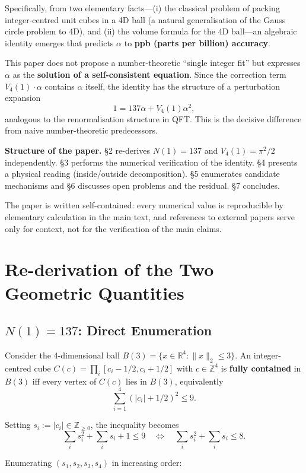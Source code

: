 \documentclass[a4paper,11pt]{article}
\begin{document}
Specifically, from two elementary facts---(i) the classical problem of packing integer-centred unit cubes in a 4D ball (a natural generalisation of the Gauss circle problem to 4D), and (ii) the volume formula for the 4D ball---an algebraic identity emerges that predicts $\alpha$ to \textbf{ppb (parts per billion) accuracy}.

This paper does not propose a number-theoretic ``single integer fit'' but expresses $\alpha$ as the \textbf{solution of a self-consistent equation}. Since the correction term $V_4(1) \cdot \alpha$ contains $\alpha$ itself, the identity has the structure of a perturbation expansion
\[ 1 = 137 \alpha + V_4(1) \alpha^2, \]
analogous to the renormalisation structure in QFT. This is the decisive difference from naive number-theoretic predecessors.

\textbf{Structure of the paper.} §2 re-derives $N(1) = 137$ and $V_4(1) = \pi^2/2$ independently. §3 performs the numerical verification of the identity. §4 presents a physical reading (inside/outside decomposition). §5 enumerates candidate mechanisms and §6 discusses open problems and the residual. §7 concludes.

The paper is written self-contained: every numerical value is reproducible by elementary calculation in the main text, and references to external papers serve only for context, not for the verification of the main claims.

\section{Re-derivation of the Two Geometric Quantities}

\subsection{$N(1) = 137$: Direct Enumeration}

Consider the 4-dimensional ball $B(3) = \{x \in \mathbb{R}^4 : \|x\|_2 \le 3\}$. An integer-centred cube $C(c) = \prod_i [c_i - 1/2, c_i + 1/2]$ with $c \in \mathbb{Z}^4$ is \textbf{fully contained} in $B(3)$ iff every vertex of $C(c)$ lies in $B(3)$, equivalently
\[ \sum_{i=1}^{4} (|c_i| + 1/2)^2 \le 9. \]

Setting $s_i := |c_i| \in \mathbb{Z}_{\ge 0}$, the inequality becomes
\[ \sum_i s_i^2 + \sum_i s_i + 1 \le 9 \quad\iff\quad \sum_i s_i^2 + \sum_i s_i \le 8. \]

Enumerating $(s_1, s_2, s_3, s_4)$ in increasing order:
\end{document}
